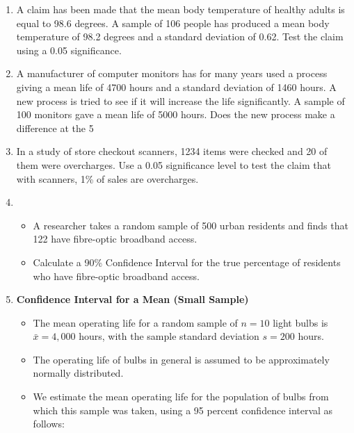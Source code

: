 \documentclass[]{report}
\begin{document}
\begin{enumerate}
	
	{\bf(a)} Calculate the sample mean and standard deviation.  Calculate a 95\% confidence interval.   Based on the confidence interval, does it appear that the machine is working correctly?
	
	
	\item A claim has been made that the mean body temperature of healthy adults is equal to 98.6 degrees. 
	A sample of 106 people has produced a mean body temperature of 98.2 degrees and a standard deviation of 0.62. Test the claim using a 0.05 significance.
	
	\item A manufacturer of computer monitors  has for many years used a process giving a mean life of 4700 hours and a standard deviation of 1460 hours. 
	A new process is tried to see if it will increase the life significantly. A sample of 100 monitors gave a mean life of 5000 hours.  
	Does the new process make a difference at the 5%
	
	\item In a study of store checkout scanners, 1234 items were checked and 20 of them were overcharges.
	Use a 0.05 significance level to test the claim that with scanners, 1\% of sales are overcharges.
	

	
	\item 
	
	
	\begin{itemize}
		\item A researcher takes a random sample of 500 urban residents and finds that
		122 have fibre-optic broadband access. 
		\item Calculate a 90\% Confidence Interval for
		the true percentage of residents who have fibre-optic broadband access.
	\end{itemize}
	
	
	\item \textbf{Confidence Interval for a Mean (Small Sample)} \\
	\begin{itemize}
		\item The mean operating life for a random sample of $n = 10$ light bulbs is $\bar{x} = 4,000$ hours, with the sample
		standard deviation $s = 200$ hours. 
		
		\item The operating life of bulbs in general is assumed to be approximately normally distributed.
		\item We estimate the mean operating life for the population of bulbs from which this sample was taken, using a 95 percent confidence interval as follows:
		

\end{itemize}
\end{enumerate}
\end{document}
